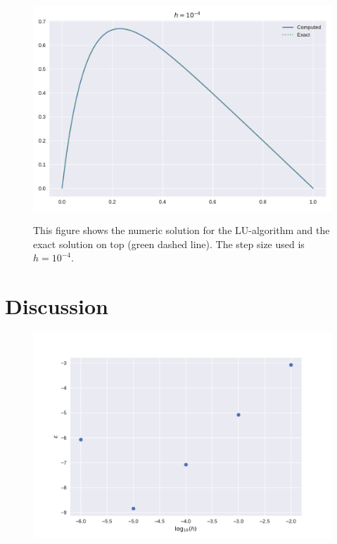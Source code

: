 \documentclass[reprint, english,notitlepage]{revtex4-1}  %
\begin{document}
\begin{figure}[h]
	\centering
	\includegraphics[scale=0.5]{../output/lu_4.pdf}
	\label{fig:lu_4}
	\caption{This figure shows the numeric solution for the LU-algorithm and the exact solution on top (green dashed line). The step size used is $h=10^{-4}$.
		\label{fig:illustrasjon}} 
\end{figure}
\section{Discussion}

\begin{figure}[h]
	\centering
	\includegraphics[scale=0.5]{../output/slow_errors.pdf}
	\label{fig:slow_error}
	\caption{
		\label{fig:illustrasjon}} 
\end{figure}
\end{document}
